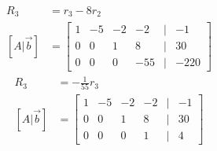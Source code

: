 \documentclass{article}
\begin{document}
\begin{enumerate}[label=\textbf{Set \arabic*}]
\begin{align*}
			R_3 & = r_3 - 8r_2 \\
			[A|\vec{b}] & = \begin{bmatrix}
				1 & -5 & -2 & -2 & | & -1 \\
				0 & 0 & 1 & 8 & | & 30 \\
				0 & 0 & 0 & -55 & | & -220
			\end{bmatrix}
		\end{align*}
		\begin{align*}
			R_3 & = -\frac{1}{55}r_3 \\
			[A|\vec{b}] & = \begin{bmatrix}
				1 & -5 & -2 & -2 & | & -1 \\
				0 & 0 & 1 & 8 & | & 30 \\
				0 & 0 & 0 & 1 & | & 4
			\end{bmatrix}
		\end{align*}
\end{enumerate}
\end{document}
